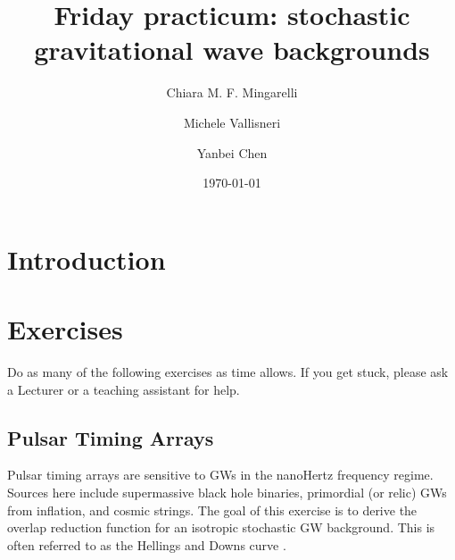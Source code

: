 \documentclass[article, onecolumn, ,nofootinbib,nopreprintnumbers]{revtex4}
\begin{document}
\title{Friday practicum: stochastic gravitational wave backgrounds}
\author{Chiara M. F. Mingarelli}
\author{Michele Vallisneri}
\author{Yanbei Chen}

\date\today
\maketitle

\section{Introduction}

\section{Exercises}
Do as many of the following exercises as time allows. If you get stuck, please ask a Lecturer or a teaching assistant for help.

\subsection{Pulsar Timing Arrays}
Pulsar timing arrays are sensitive to GWs in the nanoHertz frequency regime. Sources here include supermassive black hole binaries, primordial (or relic) GWs from inflation, and cosmic strings. The goal of this exercise is to derive the overlap reduction function for an isotropic stochastic GW background. This is often referred to as the Hellings and Downs curve \cite{HellingsDowns:1983}.

\end{document}
